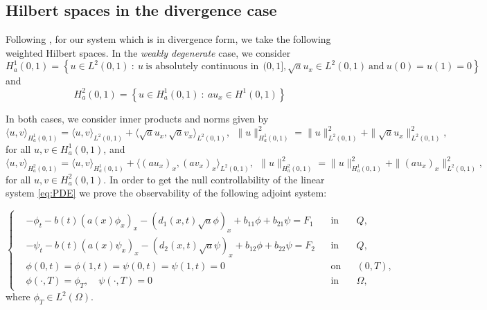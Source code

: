 \documentclass[11pt,oneside,a4papper]{osajnl}
\begin{document}
\subsection{Hilbert spaces in the divergence case}
\label{subsec:prelim}
   Following \cite{Alabau_cannarsa_fragnelli-06}, for our system which is in divergence form, we take the following weighted Hilbert spaces. In the \emph{weakly degenerate} case, we consider
   $$H^1_a(0,1)=\left\{ u\in L^2(0,1) \ : \ u \ \text{is absolutely continuous in} \ \ (0,1], \sqrt{a}u_x\in L^2(0,1) \ \text{and} \  u(0)=u(1)=0 \right\}$$
   and 
   $$H^2_a(0,1)=\left\{u\in H^1_a(0,1) \ : \ au_x\in H^1(0,1) \right\}$$
   
In both cases, we consider inner products and norms given by
   $$\langle u,v \rangle_{H^1_a(0,1)}=\langle u,v \rangle_{L^2(0,1)}+\langle \sqrt{a}u_x,\sqrt{a}v_x \rangle_{L^2(0,1)}, \ \ \|u\|^2_{H^1_a(0,1)}=\|u\|^2_{L^2(0,1)}+\|\sqrt{a} u_x\|^2_{L^2(0,1)},$$
for all $u, v\in H^1_a(0,1)$, and
  $$\langle u,v \rangle_{H^2_a(0,1)}=\langle u,v \rangle_{H^1_a(0,1)}+\langle ({a}u_x)_x,({a}v_x)_x \rangle_{L^2(0,1)}, \ \ \|u\|^2_{H^2_a(0,1)}=\|u\|^2_{H^1_a(0,1)}+\|({a}u_x)_x\|^2_{L^2(0,1)},$$
for all $u, v\in H^2_a(0,1)$.
In order to get the null controllability of the linear system \eqref{eq:PDE} we prove the observability of the following adjoint system:

\begin{equation}\label{eq:adjoint_PDE}
	\left\{\begin{aligned}
		&-\phi_t - b(t) \left(a(x) \phi_{x}\right)_{x} - (d_1(x,t)\sqrt{a}\phi)_x + b_{11}\phi + b_{21}\psi = F_1 &&\text{in} && Q,\\
        &-\psi_t - b(t) \left(a(x) \psi_{x}\right)_{x} - (d_2(x,t)\sqrt{a}\psi)_x + b_{12}\phi + b_{22}\psi = F_2 &&\text{in}&& Q,\\	&\phi(0,t)=\phi(1,t)=\psi(0,t)=\psi(1,t)=0&&\text{on} && (0,T), \\
		&\phi(\cdot,T) = \phi_T, \quad \psi(\cdot,T) = 0 &&\text{in} && \Omega,
	\end{aligned}
	\right.
\end{equation}
where $\phi_T\in L^2(\Omega)$.
\end{document}
